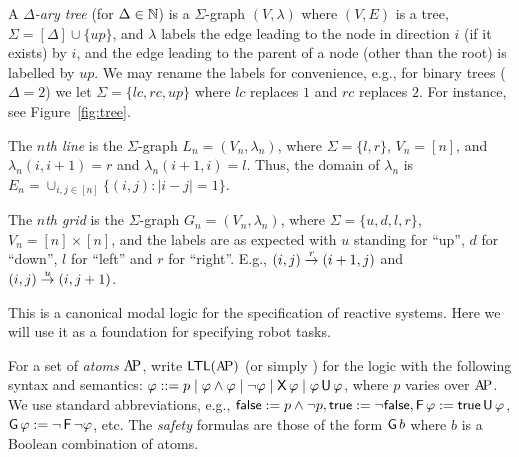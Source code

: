  A {\em $\Delta$-ary tree} (for $\Delta \in \nat$) is a $\Sigma$-graph $(V,\lambda)$ where $(V,E)$ is a tree, $\Sigma = [\Delta] \cup \{up\}$, and $\lambda$ labels the edge leading to the node in direction $i$ (if it exists) by $i$, and the edge leading to the parent of a node (other than the root) is labelled by $up$. We may rename the labels for convenience, e.g., for binary trees ($\Delta = 2$) we let $\Sigma = \{lc,rc,up\}$ where $lc$ replaces $1$ and $rc$ replaces $2$. For instance, see Figure~\ref{fig:tree}.

 The \emph{$n$th line} is the $\Sigma$-graph $L_n = (V_n,\lambda_n)$, where $\Sigma = \{l,r\}$, $V_n = [n]$, and $\lambda_n(i,i+1) = r$ and $\lambda_n(i+1,i) = l$. Thus, the domain of $\lambda_n$ is  $E_n = \cup_{i,j \in [n]} \{(i,j) : |i-j| = 1\}$. \label{def:line}

 The \emph{$n$th grid} is the $\Sigma$-graph $G_n = (V_n,\lambda_n)$, where $\Sigma = \{u,d,l,r\}$, $V_n = [n] \times [n]$,  and the labels are as expected with $u$ standing for ``up'', $d$ for ``down'', $l$ for ``left'' and $r$ for ``right''. E.g., $\trans{(i,j)}{(i+1,j)}{r}$ and $\trans{(i,j)}{(i,j+1)}{u}$.







 \label{dfn:LTL}
This is a canonical modal logic for the specification of reactive systems. Here we will use it as a foundation for specifying robot tasks.

For a set of \emph{atoms} $\AP$, write $\LTL(\AP)$ (or simply \LTL) for the logic with the following syntax and semantics:
$\varphi ::= p \mid \varphi \wedge \varphi \mid \neg \varphi \mid \nextX \varphi \mid \varphi \until \varphi$, where $p$ varies over $\AP$.
We use standard abbreviations, e.g., $\false := p \wedge \neg p, \true := \neg \false, \eventually \varphi := \true \until \varphi$,
	$\always \varphi := \neg \eventually \neg \varphi$, etc.
	The \emph{safety} formulas are those of the form $\always b$ where $b$ is a Boolean combination of atoms.
	
